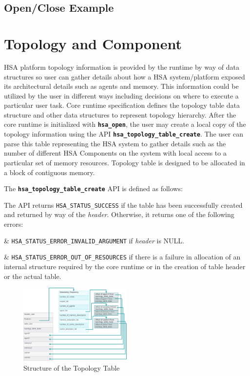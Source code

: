 \documentclass{book}
\newcommand{\diffblock}[1]{#1}
\newcommand{\ttbf}[1]{\diffblock{\texttt{\textbf{#1}}}}
\newcommand{\dbtt}[1]{\diffblock{\texttt{#1}}}
\begin{document}
\subsection{Open/Close Example}



\hypertarget{component}{}\section{Topology and Component
}\label{topology} HSA platform topology information is provided by the
runtime by way of data structures so user can gather details about how
a HSA system/platform exposed its architectural details such as agents
and memory. This information could be utilized by the user in
different ways including decisions on where to execute a particular
user task. Core runtime specification defines the topology table data
structure and other data structures to represent topology hierarchy.
After the core runtime is initialized with \ttbf{hsa\_open}, the user
may create a local copy of the topology information using the API
\ttbf{hsa\_topology\_table\_create}. The user can parse this table
representing the HSA system to gather details such as the number of
different HSA Components on the system with local access to a
particular set of memory resources. Topology table is designed to be
allocated in a block of contiguous memory.

The \ttbf{hsa\_topology\_table\_create} API is defined as follows:



The API returns \dbtt{HSA\_STATUS\_SUCCESS} if the table has been
successfully created and returned by way of the {\itshape header}. Otherwise,
it returns one of the following errors:

\begin{easylist}
& \dbtt{HSA\_STATUS\_ERROR\_INVALID\_ARGUMENT} if {\itshape header}
is NULL.

& \dbtt{HSA\_STATUS\_ERROR\_OUT\_OF\_RESOURCES} if there is a failure
in allocation of an internal structure required by the core runtime
or in the creation of table header or the actual table.
\end{easylist}

\begin{figure}
  \centering
  \includegraphics[width=0.5\textwidth]{fig/topologytable}
  \centering
  \caption{Structure of the Topology Table}
  \label{fig:topology_table}
\end{figure}
\end{document}
